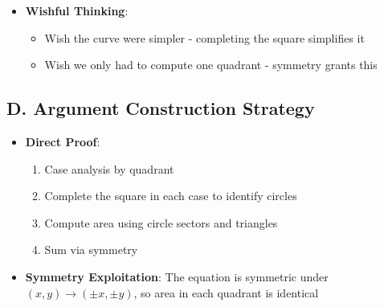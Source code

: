 \documentclass[]{article}
\begin{document}
\begin{strategicbox}
\begin{itemize}[leftmargin=*]
    \item \textbf{Wishful Thinking}: 
    \begin{itemize}
        \item Wish the curve were simpler - completing the square simplifies it
        \item Wish we only had to compute one quadrant - symmetry grants this
    \end{itemize}
\end{itemize}

\subsection*{D. Argument Construction Strategy}
\begin{itemize}[leftmargin=*]
    \item \textbf{Direct Proof}: 
    \begin{enumerate}
        \item Case analysis by quadrant
        \item Complete the square in each case to identify circles
        \item Compute area using circle sectors and triangles
        \item Sum via symmetry
    \end{enumerate}
    
    \item \textbf{Symmetry Exploitation}: The equation is symmetric under $(x,y) \to (\pm x, \pm y)$, so area in each quadrant is identical
\end{itemize}
\end{strategicbox}
\end{document}
